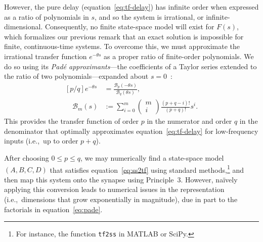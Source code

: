 However, the pure delay (equation~\ref{eq:tf-delay}) has infinite order when expressed as a ratio of polynomials in $s$, and so the system is irrational, or infinite-dimensional.
Consequently, no finite state-space model will exist for $F(s)$, which formalizes our previous remark that an exact solution is impossible for finite, continuous-time systems.
To overcome this, we must approximate the irrational transfer function $e^{-\theta s}$ as a proper ratio of finite-order polynomials.
We do so using its \emph{Pad\'e approximants}---the coefficients of a Taylor series extended to the ratio of two polynomials---expanded about $s=0$~\citep{Pade1892, vajta2000some}:
\begin{equation} \label{eq:pade}
\begin{aligned}
\left[ p/q \right] e^{-\theta s} &= \frac{\mathcal{B}_{p}(-\theta s)}{\mathcal{B}_{q}(\theta s)} \text{,} \\
\quad \mathcal{B}_m(s) &:= \sum_{i=0}^m \begin{pmatrix}m \\ i\end{pmatrix} \frac{(p + q - i)!}{(p + q)!} s^i \text{.}
\end{aligned}
\end{equation}
This provides the transfer function of order $p$ in the numerator and order $q$ in the denominator that optimally approximates equation~\ref{eq:tf-delay} for low-frequency inputs (i.e.,~up to order $p + q$).

After choosing $0 \le p \le q$, we may numerically find a state-space model $(A\text{,}\, B\text{,}\, C\text{,}\, D)$ that satisfies equation~\ref{eq:ss2tf} using standard methods,\footnote{
For instance, the function \texttt{tf2ss} in MATLAB or SciPy.}
and then map this system onto the synapse using Principle~3.
However, na\"ively applying this conversion leads to numerical issues in the representation (i.e.,~dimensions that grow exponentially in magnitude), due in part to the factorials in equation~\ref{eq:pade}.

